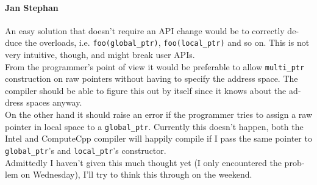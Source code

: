 \begin{otherlanguage}{english}
    \paragraph{Jan Stephan} An easy solution that doesn't require an API change
                            would be to correctly deduce the overloads, i.e.
                            \texttt{foo(global\_ptr)}, \texttt{foo(local\_ptr)}
                            and so on. This is not very intuitive, though, and
                            might break user APIs.
                            \\
                            From the programmer's point of view it would be
                            preferable to allow \texttt{multi\_ptr}
                            construction on raw pointers without having to
                            specify the address space. The compiler should be
                            able to figure this out by itself since it knows
                            about the address spaces anyway.
                            \\
                            On the other hand it should raise an error if the
                            programmer tries to assign a raw pointer in local
                            space to a \texttt{global\_ptr}. Currently this
                            doesn't happen, both the Intel and ComputeCpp
                            compiler will happily compile if I pass the same
                            pointer to \texttt{global\_ptr}'s and
                            \texttt{local\_ptr}'s constructor.
                            \\
                            Admittedly I haven't given this much thought yet (I
                            only encountered the problem on Wednesday), I'll try
                            to think this through on the weekend.

\end{otherlanguage}
